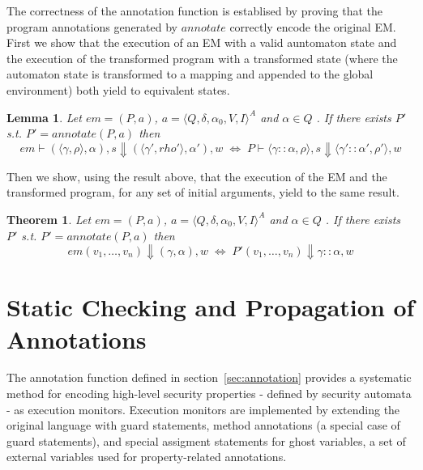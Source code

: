 \documentclass[10pt,notitlepage,twoside]{article}
\newcommand{\aut}{a}
\newcommand{\automata}[5]{\langle #1,#2,#3,#4,#5 \rangle^A}
\newcommand{\qu}{\alpha}
\newcommand{\theautomaton}{\automata{Q}{\delta}{\qu_0}{V}{I}}
\newcommand{\emdef}[2]{(#1,#2)}
\newcommand{\state}[1]{\langle #1 \rangle}
\newcommand{\genv}{\gamma}
\newtheorem{theorem}{Theorem}
\newtheorem{lemma}{Lemma}
\begin{document}
The correctness of the annotation function is establised by proving that  the program annotations generated by  $\mathit{annotate}$ correctly encode the original EM. First we show that the execution of an EM with a valid auntomaton state and the execution of the transformed program with a transformed state (where the automaton state is transformed to a mapping and appended to the global environment) both yield to equivalent states. 

\begin{lemma}
Let  $em = \emdef{P}{\aut}$, $\aut = \theautomaton$ and  $\qu \in Q$ . If there exists $P'$ s.t. $P' = \mathit{annotate}(P,\aut)$ then
\begin{displaymath}
em \vdash (\state{\genv,\rho},\qu),s \Downarrow (\state{\genv',rho'},\qu'),w
\;\Leftrightarrow\;
P \vdash \state{\genv::\qu,\rho},s \Downarrow \state{\genv'::\qu',\rho'},w
\end{displaymath}
\end{lemma}

Then we show, using the result above, that the execution of the EM and the transformed program, for any set of initial arguments, yield to the same result.

\begin{theorem}
Let  $em = \emdef{P}{\aut}$, $\aut = \theautomaton$ and  $\qu \in Q$ . If there exists $P'$ s.t. $P' = \mathit{annotate}(P,\aut)$ then
\begin{displaymath}
em(v_1,\ldots,v_n) \Downarrow (\genv,\qu),w
\;\Leftrightarrow\;
P'(v_1,\ldots,v_n) \Downarrow \genv::\qu,w
\end{displaymath}

\end{theorem}





\section{Static Checking and Propagation of Annotations}\label{sec:propagation}

The annotation function defined in section~\ref{sec:annotation} provides a systematic method for encoding high-level security properties - defined by security automata - as execution monitors.
Execution monitors are implemented by extending the original language with guard statements, method annotations (a special case of guard statements), and special assigment statements for ghost variables, a set of external variables used for property-related annotations.
\end{document}
